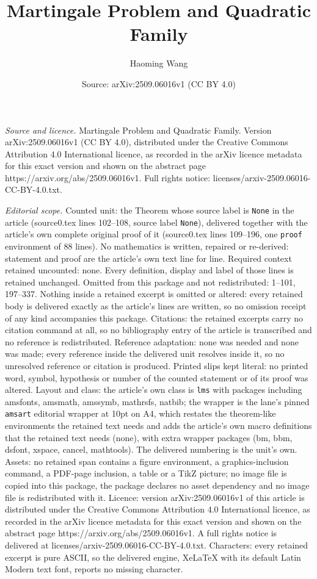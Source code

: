 \documentclass[10pt,a4paper]{amsart}
\title[Martingale Problem and Quadratic Family]{Martingale Problem and Quadratic Family}
\author{Haoming Wang}
\date{Source: arXiv:2509.06016v1 (CC BY 4.0)}
\begin{document}
\maketitle

\noindent\emph{Source and licence.} Martingale Problem and Quadratic Family. Version arXiv:2509.06016v1 (CC BY 4.0), distributed under the Creative Commons Attribution 4.0 International licence, as recorded in the arXiv licence metadata for this exact version and shown on the abstract page https://arxiv.org/abs/2509.06016v1. Full rights notice: licenses/arxiv-2509.06016-CC-BY-4.0.txt.\par\smallskip

\noindent\textit{Editorial scope.} Counted unit: the Theorem whose source label is \texttt{None} in the article (source0.tex lines 102--108, source label \texttt{None}), delivered together with the article's own complete original proof of it (source0.tex lines 109--196, one \texttt{proof} environment of 88 lines). No mathematics is written, repaired or re-derived: statement and proof are the article's own text line for line. Required context retained uncounted: none. Every definition, display and label of those lines is retained unchanged. Omitted from this package and not redistributed: 1--101, 197--337. Nothing inside a retained excerpt is omitted or altered: every retained body is delivered exactly as the article's lines are written, so no omission receipt of any kind accompanies this package. Citations: the retained excerpts carry no citation command at all, so no bibliography entry of the article is transcribed and no reference is redistributed. Reference adaptation: none was needed and none was made; every reference inside the delivered unit resolves inside it, so no unresolved reference or citation is produced. Printed slips kept literal: no printed word, symbol, hypothesis or number of the counted statement or of its proof was altered. Layout and class: the article's own class is \texttt{lms} with packages including amsfonts, amsmath, amssymb, mathrsfs, natbib; the wrapper is the lane's pinned \texttt{amsart} editorial wrapper at 10pt on A4, which restates the theorem-like environments the retained text needs and adds the article's own macro definitions that the retained text needs (none), with extra wrapper packages (bm, bbm, dsfont, xspace, cancel, mathtools). The delivered numbering is the unit's own. Assets: no retained span contains a figure environment, a graphics-inclusion command, a PDF-page inclusion, a table or a TikZ picture; no image file is copied into this package, the package declares no asset dependency and no image file is redistributed with it. Licence: version arXiv:2509.06016v1 of this article is distributed under the Creative Commons Attribution 4.0 International licence, as recorded in the arXiv licence metadata for this exact version and shown on the abstract page https://arxiv.org/abs/2509.06016v1. A full rights notice is delivered at licenses/arxiv-2509.06016-CC-BY-4.0.txt. Characters: every retained excerpt is pure ASCII, so the delivered engine, XeLaTeX with its default Latin Modern text font, reports no missing character.
\end{document}
